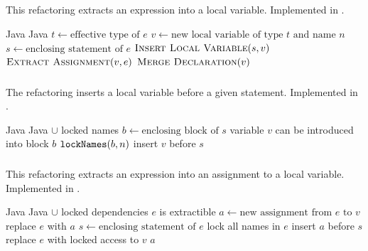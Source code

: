 \subsection{}
This refactoring extracts an expression into a local variable. Implemented in .

\begin{algorithm}
\caption{$\refactoring{Extract Temp}(e : \type{Expr}, n : \type{Name})$}
\begin{algorithmic}[1]
\REQUIRE Java
\ENSURE Java
\medskip
\STATE $t \leftarrow \text{effective type of $e$}$
\STATE $v \leftarrow \text{new local variable of type $t$ and name $n$}$
\STATE $s \leftarrow \text{enclosing statement of $e$}$
\STATE $\textsc{Insert Local Variable}(s, v)$
\STATE $\textsc{Extract Assignment}(v, e)$
\STATE $\textsc{Merge Declaration}(v)$
\end{algorithmic}
\end{algorithm}

\subsubsection{}
The refactoring inserts a local variable before a given statement. Implemented in .

\begin{algorithm}
\caption{$\refactoring{Insert Local Variable}(s : \type{Stmt}, v : \type{LocalVar}$}
\begin{algorithmic}[1]
\REQUIRE Java
\ENSURE Java $\cup$ locked names
\medskip
\STATE $b \leftarrow \text{enclosing block of $s$}$
\STATE \assert variable $v$ can be introduced into block $b$
\STATE $\text{\texttt{lockNames}}(b, n)$
\STATE insert $v$ before $s$
\end{algorithmic}
\end{algorithm}

\subsubsection{}
This refactoring extracts an expression into an assignment to a local variable. Implemented in .

\begin{algorithm}
\caption{$\refactoring{Extract Assignment}(v : \type{LocalVar}, e : \type{Expr}) : \type{Assignment}$}
\begin{algorithmic}[1]
\REQUIRE Java
\ENSURE Java $\cup$ locked dependencies
\medskip
\STATE \assert $e$ is extractible
\STATE $a \leftarrow \text{new assignment from $e$ to $v$}$
  \STATE replace $e$ with $a$
\ELSE
  \STATE $s \leftarrow \text{enclosing statement of $e$}$
  \STATE lock all names in $e$
  \STATE insert $a$ before $s$
  \STATE replace $e$ with locked access to $v$
\ENDIF
\RETURN $a$
\end{algorithmic}
\end{algorithm}

